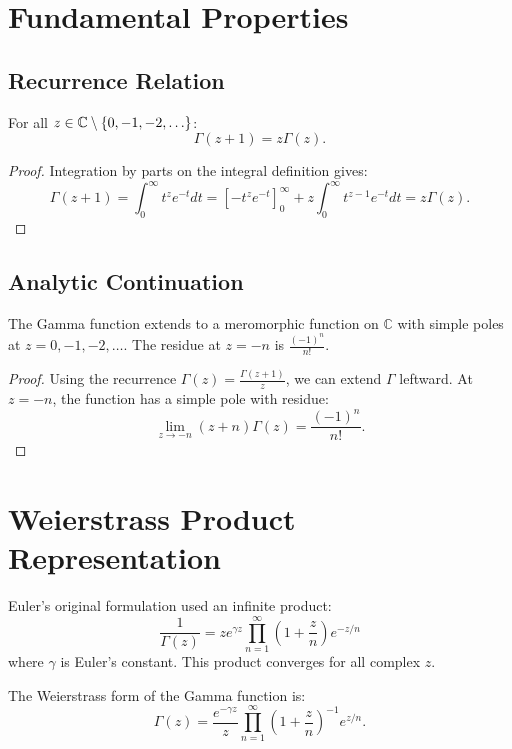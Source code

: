 \section{Fundamental Properties}

\subsection{Recurrence Relation}

\begin{theorem}
For all $z \in \mathbb{C} \setminus \{0, -1, -2, \ldots\}$:
\[
\Gamma(z+1) = z \Gamma(z).
\]
\end{theorem}

\begin{proof}
Integration by parts on the integral definition gives:
\[
\Gamma(z+1) = \int_0^\infty t^z e^{-t} dt = \left[-t^z e^{-t}\right]_0^\infty + z\int_0^\infty t^{z-1} e^{-t} dt = z\Gamma(z).
\]
\end{proof}

\subsection{Analytic Continuation}

\begin{theorem}
The Gamma function extends to a meromorphic function on $\mathbb{C}$ with simple poles at $z = 0, -1, -2, \ldots$. The residue at $z = -n$ is $\frac{(-1)^n}{n!}$.
\end{theorem}

\begin{proof}
Using the recurrence $\Gamma(z) = \frac{\Gamma(z+1)}{z}$, we can extend $\Gamma$ leftward. At $z = -n$, the function has a simple pole with residue:
\[
\lim_{z \to -n} (z + n)\Gamma(z) = \frac{(-1)^n}{n!}.
\]
\end{proof}

\section{Weierstrass Product Representation}

Euler's original formulation used an infinite product:
\[
\frac{1}{\Gamma(z)} = z e^{\gamma z} \prod_{n=1}^\infty \left(1 + \frac{z}{n}\right) e^{-z/n}
\]
where $\gamma$ is Euler's constant. This product converges for all complex $z$.

\begin{theorem}
The Weierstrass form of the Gamma function is:
\[
\Gamma(z) = \frac{e^{-\gamma z}}{z} \prod_{n=1}^\infty \left(1 + \frac{z}{n}\right)^{-1} e^{z/n}.
\]
\end{theorem}

